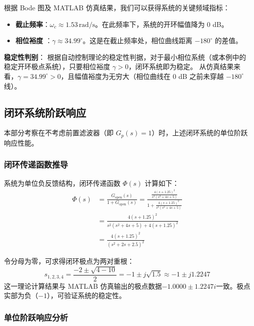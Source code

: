 \documentclass[a4paper,zihao=-4]{article}
\numberwithin{equation}{section}
\numberwithin{figure}{section}
\numberwithin{table}{section}
\begin{document}
	根据 Bode 图及 MATLAB 仿真结果，我们可以获得系统的关键频域指标：
	
	\begin{itemize}
		\item \textbf{截止频率}：$\omega_c \approx 1.53 \, \text{rad/s}$。在此频率下，系统的开环幅值降为 0 dB。
		\item \textbf{相位裕度 }：$\gamma \approx 34.99^\circ$。这是在截止频率处，相位曲线距离 $-180^\circ$ 的差值。
	\end{itemize}
	
	\textbf{稳定性判别}：
	根据自动控制理论的稳定性判据，对于最小相位系统（或本例中的稳定开环极点系统），只要相位裕度 $\gamma > 0$，闭环系统即为稳定。
	从仿真结果来看，$\gamma = 34.99^\circ > 0$，且幅值裕度为无穷大（相位曲线在 0 dB 之前未穿越 $-180^\circ$ 线）。
	
	
	\subsection{闭环系统阶跃响应}
	
	本部分考察在不考虑前置滤波器（即 $G_p(s)=1$）时，上述闭环系统的单位阶跃响应性能。
	
	\subsubsection{闭环传递函数推导}
	
	系统为单位负反馈结构，闭环传递函数 $\Phi(s)$ 计算如下：
	\begin{equation}
		\begin{aligned}
			\Phi(s) 
			&= \frac{G_{\text{open}}(s)}{1 + G_{\text{open}}(s)} = \frac{\frac{4(s+1.25)^2}{s^2(s^2+4s+5)}}{1 + \frac{4(s+1.25)^2}{s^2(s^2+4s+5)}} \\
			&= \frac{4(s+1.25)^2}{s^2(s^2+4s+5) + 4(s+1.25)^2} \\
			&= \frac{4(s+1.25)^2}{(s^2+2s+2.5)^2}
		\end{aligned}
	\end{equation}
	
	令分母为零，可求得闭环极点为两对重根：
	\begin{equation}
		s_{1,2,3,4} = \frac{-2 \pm \sqrt{4 - 10}}{2} = -1 \pm j\sqrt{1.5} \approx -1 \pm j1.2247
	\end{equation}
	这一理论计算结果与 MATLAB 仿真输出的极点数据$-1.0000 \pm 1.2247i$一致。极点实部为负（$-1$），可验证系统的稳定性。
	
	\subsubsection{单位阶跃响应分析}
	
\end{document}
